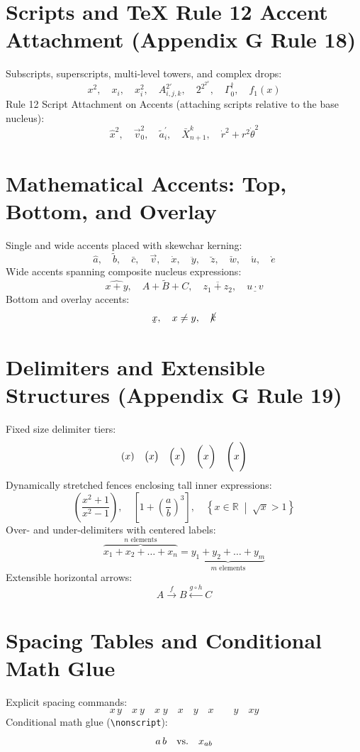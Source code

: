 \documentclass{article}
\providecommand{\utilde}[1]{\underaccent{\tilde}{#1}}
\begin{document}
\section{Scripts and TeX Rule 12 Accent Attachment (Appendix G Rule 18)}
Subscripts, superscripts, multi-level towers, and complex drops:
\[
x^2, \quad x_i, \quad x_i^2, \quad A_{i,j,k}^{2\prime}, \quad 2^{2^{2^x}}, \quad \Gamma_0^\dagger, \quad f_1(x)
\]
Rule 12 Script Attachment on Accents (attaching scripts relative to the base nucleus):
\[
\hat{x}^2, \quad \vec{v}_0^2, \quad \tilde{a}_i^\prime, \quad \bar{X}_{n+1}^k, \quad \dot{r}^2 + r^2 \dot{\theta}^2
\]

\section{Mathematical Accents: Top, Bottom, and Overlay}
Single and wide accents placed with skewchar kerning:
\[
\hat{a}, \quad \tilde{b}, \quad \bar{c}, \quad \vec{v}, \quad \dot{x}, \quad \ddot{y}, \quad \breve{z}, \quad \check{w}, \quad \acute{u}, \quad \grave{e}
\]
Wide accents spanning composite nucleus expressions:
\[
\widehat{x + y}, \quad \widetilde{A + B + C}, \quad \overline{z_1 + z_2}, \quad \underline{u \cdot v}
\]
Bottom and overlay accents:
\[
\utilde{x}, \quad x \not= y, \quad \cancel{k}
\]

\section{Delimiters and Extensible Structures (Appendix G Rule 19)}
Fixed size delimiter tiers:
\[
(x) \quad \bigl( x \bigr) \quad \Bigl( x \Bigr) \quad \biggl( x \biggr) \quad \Biggl( x \Biggr)
\]
Dynamically stretched fences enclosing tall inner expressions:
\[
\left( \frac{x^2 + 1}{x^2 - 1} \right), \quad \left[ 1 + \left( \frac{a}{b} \right)^3 \right], \quad \left\{ x \in \mathbb{R} \;\middle|\; \sqrt{x} > 1 \right\}
\]
Over- and under-delimiters with centered labels:
\[
\overbrace{x_1 + x_2 + \dots + x_n}^{n \text{ elements}} = \underbrace{y_1 + y_2 + \dots + y_m}_{m \text{ elements}}
\]
Extensible horizontal arrows:
\[
A \xrightarrow{f} B \xleftarrow{g \circ h} C
\]

\section{Spacing Tables and Conditional Math Glue}
Explicit spacing commands:
\[
x \, y \quad x \: y \quad x \; y \quad x \quad y \quad x \qquad y \quad x \! y
\]
Conditional math glue (\texttt{\textbackslash nonscript}):
\[
a \nonscript\, b \quad \text{vs.} \quad x_{a \nonscript\, b}
\]
\end{document}
